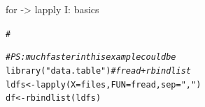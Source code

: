 \documentclass[xcolor=table,      handout ,    xcolor=dvipsnames]{beamer}\usepackage[]{graphicx}\usepackage[]{color}
\makeatletter
\newcommand{\hlstr}[1]{\textcolor[rgb]{0.545,0.137,0.137}{#1}}
\newcommand{\hlcom}[1]{\textcolor[rgb]{0,0.392,0}{\textit{#1}}}
\newcommand{\hlstd}[1]{\textcolor[rgb]{0,0,0}{#1}}
\newcommand{\hlkwb}[1]{\textcolor[rgb]{0,0,0}{#1}}
\newcommand{\hlkwc}[1]{\textcolor[rgb]{1,0,1}{#1}}
\newcommand{\hlkwd}[1]{\textcolor[rgb]{0,0,1}{#1}}
\newenvironment{kframe}{%
 \def\at@end@of@kframe{}%
 \ifinner\ifhmode%
  \def\at@end@of@kframe{\end{minipage}}%
  \begin{minipage}{\columnwidth}%
 \fi\fi%
 \def\FrameCommand##1{\hskip\@totalleftmargin \hskip-\fboxsep
 \colorbox{shadecolor}{##1}\hskip-\fboxsep
     \hskip-\linewidth \hskip-\@totalleftmargin \hskip\columnwidth}%
 \MakeFramed {\advance\hsize-\width
   \@totalleftmargin\z@ \linewidth\hsize
   \@setminipage}}%
 {\par\unskip\endMakeFramed%
 \at@end@of@kframe}
\newenvironment{knitrout}{}{} %
\makeatother
\begin{document}
\begin{frame}[fragile]{for -> lapply I: basics}
\begin{knitrout}
\begin{kframe}
\begin{alltt}
\hlcom{#}
\end{alltt}
\end{kframe}
\end{knitrout}
\pause \vspace{-2.7em}
\begin{knitrout}
\color{fgcolor}\begin{kframe}
\begin{alltt}
\hlcom{# PS: much faster in this example could be}
\hlkwd{library}\hlstd{(}\hlstr{"data.table"}\hlstd{)} \hlcom{# fread + rbindlist}
\hlstd{ldfs} \hlkwb{<-} \hlkwd{lapply}\hlstd{(}\hlkwc{X}\hlstd{=files,} \hlkwc{FUN}\hlstd{=fread,} \hlkwc{sep}\hlstd{=}\hlstr{","}\hlstd{)}
\hlstd{df} \hlkwb{<-} \hlkwd{rbindlist}\hlstd{(ldfs)}
\end{alltt}
\end{kframe}
\end{knitrout}
\end{frame}

\end{document}
